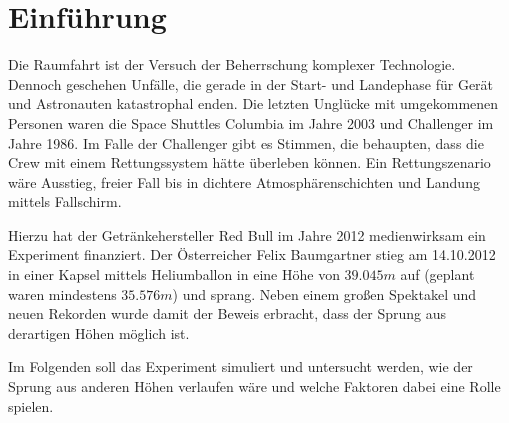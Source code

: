\newpage

\section{Einführung}

Die Raumfahrt ist der Versuch der Beherrschung komplexer Technologie.
Dennoch geschehen Unfälle, die gerade in der Start- und Landephase für Gerät und Astronauten katastrophal enden.
Die letzten Unglücke mit umgekommenen Personen waren die Space Shuttles Columbia im Jahre 2003 und Challenger im Jahre 1986.
Im Falle der Challenger gibt es Stimmen, die behaupten, dass die Crew mit einem Rettungssystem hätte überleben können.
Ein Rettungszenario wäre Ausstieg, freier Fall bis in dichtere Atmosphärenschichten und Landung mittels Fallschirm.

Hierzu hat der Getränkehersteller Red Bull im Jahre 2012 medienwirksam ein Experiment finanziert.
Der Österreicher Felix Baumgartner stieg am 14.10.2012 in einer Kapsel mittels Heliumballon in eine Höhe von $39.045m$ auf (geplant waren mindestens $35.576m$) und sprang.
Neben einem großen Spektakel und neuen Rekorden wurde damit der Beweis erbracht, dass der Sprung aus derartigen Höhen möglich ist.

Im Folgenden soll das Experiment simuliert und untersucht werden, wie der Sprung aus anderen Höhen verlaufen wäre und welche Faktoren dabei eine Rolle spielen.

